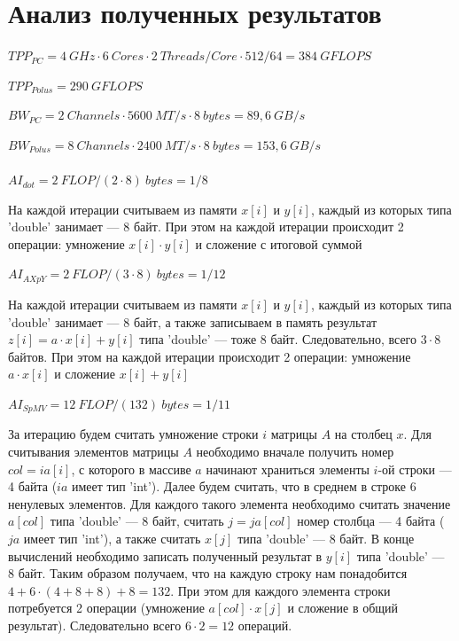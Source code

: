 \documentclass[12pt, a4paper]{article}
\begin{document}
\newpage

\section{Анализ полученных результатов}

$ TPP_{PC} = 4\ GHz \cdot 6\ Cores \cdot 2\ Threads/Core \cdot 512/64 = 384\ GFLOPS $ 

$ TPP_{Polus} = 290\ GFLOPS $

$ BW_{PC} = 2\ Channels \cdot 5600\ MT/s \cdot 8\ bytes = 89,6\ GB/s $

$ BW_{Polus} = 8\ Channels \cdot 2400\ MT/s \cdot 8\ bytes = 153,6\ GB/s $ \\ \\

$ AI_{dot} = 2\ FLOP / (2 \cdot 8)\ bytes = 1/8 $

На каждой итерации считываем из памяти $x[i]$ и $y[i]$, каждый из которых типа 'double' занимает --- 8 байт. При этом на каждой итерации происходит 2 операции: умножение $x[i] \cdot y[i]$ и сложение с итоговой суммой

$ AI_{AXpY} = 2\ FLOP / (3 \cdot 8)\ bytes = 1/12 $

На каждой итерации считываем из памяти $x[i]$ и $y[i]$, каждый из которых типа 'double' занимает --- 8 байт, а также записываем в память результат $z[i] = a \cdot x[i] + y[i]$ типа 'double' --- тоже 8 байт. Следовательно, всего $3 \cdot 8$ байтов. При этом на каждой итерации происходит 2 операции: умножение $a \cdot x[i]$ и сложение $x[i] + y[i]$

$ AI_{SpMV} = 12\ FLOP / (132)\ bytes = 1/11 $ 

За итерацию будем считать умножение строки $i$ матрицы $A$ на столбец $x$. Для считывания элементов матрицы $A$ необходимо вначале получить номер $col=ia[i]$, с которого в массиве $a$ начинают храниться элементы $i$-ой строки --- 4 байта ($ia$ имеет тип 'int'). Далее будем считать, что в среднем в строке 6 ненулевых элементов. Для каждого такого элемента необходимо считать значение $a[col]$ типа 'double' --- 8 байт, считать $j = ja[col]$ номер столбца --- 4 байта ($ja$ имеет тип 'int'), а также считать $x[j]$ типа 'double' --- 8 байт. В конце вычислений необходимо записать полученный результат в $y[i]$ типа 'double' --- 8 байт. Таким образом получаем, что на каждую строку нам понадобится $4 + 6 \cdot (4 + 8 + 8) + 8 = 132$. При этом для каждого элемента строки потребуется 2 операции (умножение $a[col] \cdot x[j]$ и сложение в общий результат). Следовательно всего $6 \cdot 2 = 12$ операций.
 \\ \\ 
\end{document}
